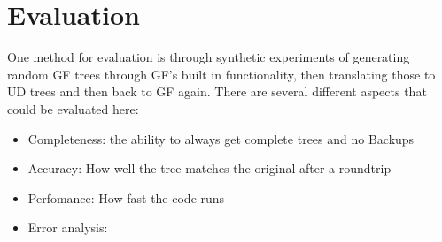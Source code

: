 \documentclass{article}
\begin{document}
%
%
%

\section{Evaluation}
One method for evaluation is through synthetic experiments of generating random GF trees through GF's built in functionality, then translating those to UD trees and then back to GF again. There are several different aspects that could be evaluated here:
\begin{itemize}
    \item Completeness: the ability to always get complete trees and no Backups
    \item Accuracy: How well the tree matches the original after a roundtrip
    \item Perfomance: How fast the code runs
    \item Error analysis: 
\end{itemize}
\end{document}
